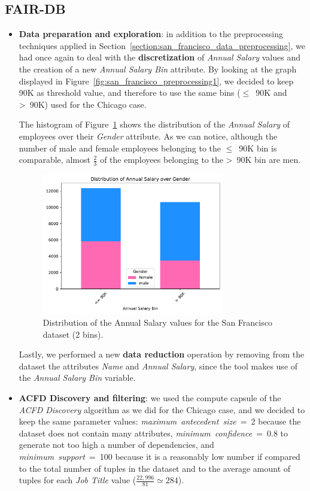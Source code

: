 \subsection{FAIR-DB}
\begin{itemize}
\item \textbf{Data preparation and exploration}: in addition to the preprocessing techniques applied in Section~\ref{section:san_francisco_data_preprocessing}, we had once again to deal with the \textbf{discretization} of \textit{Annual Salary} values and the creation of a new \textit{Annual Salary Bin} attribute. By looking at the graph displayed in Figure~\ref{fig:san_francisco_preprocessing1}, we decided to keep 90K as threshold value, and therefore to use the same bins (\(\leq\)~90K and >~90K) used for the Chicago case.

The histogram of Figure~\ref{fig:san_francisco_fair-db1} shows the distribution of the \textit{Annual Salary} of employees over their \textit{Gender} attribute. As we can notice, although the number of male and female employees belonging to the \(\leq\)~90K bin is comparable, almost \(\frac{2}{3}\) of the employees belonging to the >~90K bin are men.

\begin{figure}[t!]
\centering
\includegraphics[width=0.75\textwidth]{figures/san_francisco_2bins_annual_salary_over_gender.pdf}
\caption{Distribution of the \textrm{Annual Salary} values for the San Francisco dataset (2 bins).}
\label{fig:san_francisco_fair-db1}
\end{figure}

Lastly, we performed a new \textbf{data reduction} operation by removing from the dataset the attributes \textit{Name} and \textit{Annual Salary}, since the tool makes use of the \textit{Annual Salary Bin} variable.
\item \textbf{ACFD Discovery and filtering}: we used the compute capsule of the \textit{ACFD Discovery} algorithm as we did for the Chicago case, and we decided to keep the same parameter values: \textit{maximum~antecedent~size}~=~2 because the dataset does not contain many attributes, \textit{minimum~confidence}~=~0.8 to generate not too high a number of dependencies, and \textit{minimum~support}~=~100 because it is a reasonably low number if compared to the total number of tuples in the dataset and to the average amount of tuples for each \textit{Job Title} value (\(\frac{22,996}{81} \simeq 284\)).


\end{itemize}

